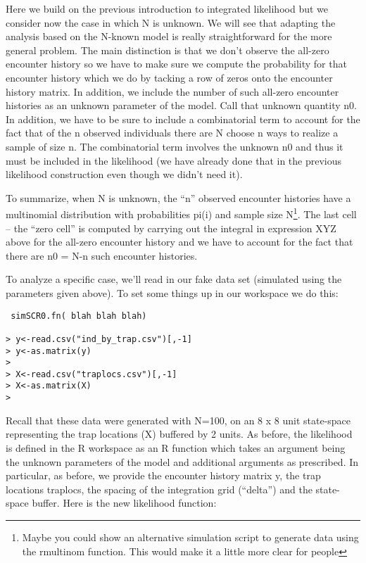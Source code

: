 Here we build on the previous introduction to integrated likelihood
but we consider now the case in which N is unknown. We will see that
adapting the analysis based on the N-known model is really
straightforward for the more general problem. The main distinction is
that we don’t observe the all-zero encounter history so we have to
make sure we compute the probability for that encounter history which
we do by tacking a row of zeros onto the encounter history matrix. In
addition, we include the number of such all-zero encounter histories
as an unknown parameter of the model. Call that unknown quantity n0.
In addition, we have to be sure to include a combinatorial term to
account for the fact that of the n observed individuals there are N
choose n ways to realize a sample of size n. The combinatorial term
involves the unknown n0 and thus it must be included in the likelihood
(we have already done that in the previous likelihood construction
even though we didn’t need it).

To summarize, when N is unknown, the “n” observed encounter histories
have a multinomial distribution with probabilities pi(i) and sample
size N\footnote{ Maybe you could show an alternative simulation script
  to generate data using the rmultinom function. This would make it a
  little more clear for people}. The last cell – the “zero cell” is
computed by carrying out the integral in expression XYZ above for the
all-zero encounter history and we have to account for the fact that
there are n0 = N-n such encounter histories.

To analyze a specific case, we’ll read in our fake data set (simulated
using the parameters given above). To set some things up in our
workspace we do this:

\begin{verbatim}
 simSCR0.fn( blah blah blah) 

> y<-read.csv("ind_by_trap.csv")[,-1]
> y<-as.matrix(y)
> 
> X<-read.csv("traplocs.csv")[,-1]
> X<-as.matrix(X)
> 

\end{verbatim}

Recall that these data were generated with N=100, on an 8 x 8 unit
state-space representing the trap locations (X) buffered by 2 units.
As before, the likelihood is defined in the R workspace as an R
function which takes an argument being the unknown parameters of the
model and additional arguments as prescribed. In particular, as
before, we provide the encounter history matrix y, the trap locations
traplocs, the spacing of the integration grid (“delta”) and the
state-space buffer. Here is the new likelihood function:

